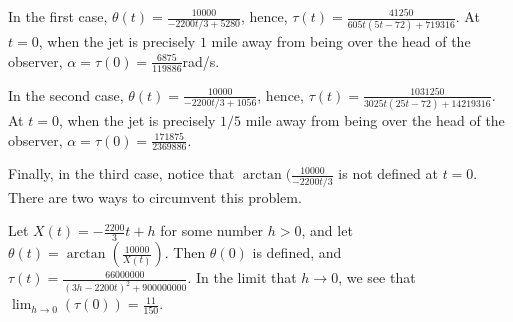\documentclass{ximera}
\begin{document}
\begin{exercise}
\begin{hint}
In the first case, $\theta(t)=\frac{10000}{-2200t/3+5280}$, hence,
$\tau(t)=\frac{41250}{605 t (5 t-72)+719316}$. At $t=0$, when the jet
is precisely $1$ mile away from being over the head of the observer,
$\alpha=\tau(0)=\frac{6875}{119886}$rad/s.

In the second case, $\theta(t)=\frac{10000}{-2200t/3+1056}$, hence,
$\tau(t)=\frac{1031250}{3025 t (25 t-72)+14219316}$. At $t=0$, when the
jet is precisely $1/5$ mile away from being over the head of the
observer, $\alpha=\tau(0)=\frac{171875}{2369886}$.

Finally, in the third case, notice that
$\arctan(\frac{10000}{-2200t/3}$ is not defined at $t=0$. There are
two ways to circumvent this problem.

Let $X(t)=-\frac{2200}{3}t+h$ for some number $h>0$, and let
$\theta(t)=\arctan(\frac{10000}{X(t)})$. Then $\theta(0)$ is defined,
and $\tau(t)=\frac{66000000}{(3 h-2200 t)^2+900000000}$. In the limit
that $h\to0$, we see that $\lim_{h\to0}(\tau(0))=\frac{11}{150}$.
\end{hint}











\end{exercise}
\end{document}
